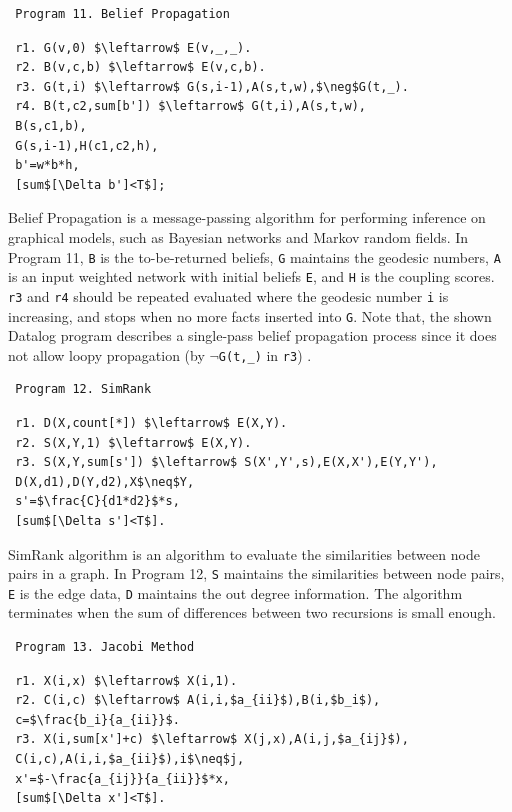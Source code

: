 \begin{appendix}
 
 \begin{verbatim}
 Program 11. Belief Propagation
 \end{verbatim}\small
 \begin{lstlisting}
 r1. G(v,0) $\leftarrow$ E(v,_,_).
 r2. B(v,c,b) $\leftarrow$ E(v,c,b).
 r3. G(t,i) $\leftarrow$ G(s,i-1),A(s,t,w),$\neg$G(t,_).
 r4. B(t,c2,sum[b']) $\leftarrow$ G(t,i),A(s,t,w),
 B(s,c1,b),
 G(s,i-1),H(c1,c2,h),
 b'=w*b*h,
 [sum$[\Delta b']<T$];
 \end{lstlisting}
 \normalsize
 
 Belief Propagation \cite{910572} is a message-passing algorithm for performing inference on graphical models, such as Bayesian networks and Markov random fields. In Program 11, \texttt{B} is the to-be-returned beliefs, \texttt{G} maintains the geodesic numbers, \texttt{A} is an input weighted network with initial beliefs \texttt{E}, and \texttt{H} is the coupling scores. \texttt{r3} and \texttt{r4} should be repeated evaluated where the geodesic number \texttt{i} is increasing, and stops when no more facts inserted into \texttt{G}. Note that, the shown Datalog program describes a single-pass belief propagation process since it does not allow loopy propagation (by $\neg$\texttt{G(t,\_)} in \texttt{r3}) \cite{Gatterbauer:2015:LSB:2735479.2735490}.
 
 \begin{verbatim}
 Program 12. SimRank
 \end{verbatim}\small
 \begin{lstlisting}
 r1. D(X,count[*]) $\leftarrow$ E(X,Y).
 r2. S(X,Y,1) $\leftarrow$ E(X,Y).
 r3. S(X,Y,sum[s']) $\leftarrow$ S(X',Y',s),E(X,X'),E(Y,Y'),
 D(X,d1),D(Y,d2),X$\neq$Y,
 s'=$\frac{C}{d1*d2}$*s,
 [sum$[\Delta s']<T$].
 \end{lstlisting}
 \normalsize
 
 SimRank algorithm \cite{Jeh:2002:SMS:775047.775126} is an algorithm to evaluate the similarities between node pairs in a graph. In Program 12, \texttt{S} maintains the similarities between node pairs, \texttt{E} is the edge data, \texttt{D} maintains the out degree information. The algorithm terminates when the sum of differences between two recursions is small enough.
 
 \begin{verbatim}
 Program 13. Jacobi Method
 \end{verbatim}\small
 \begin{lstlisting}
 r1. X(i,x) $\leftarrow$ X(i,1).
 r2. C(i,c) $\leftarrow$ A(i,i,$a_{ii}$),B(i,$b_i$),
 c=$\frac{b_i}{a_{ii}}$.
 r3. X(i,sum[x']+c) $\leftarrow$ X(j,x),A(i,j,$a_{ij}$),
 C(i,c),A(i,i,$a_{ii}$),i$\neq$j,
 x'=$-\frac{a_{ij}}{a_{ii}}$*x,
 [sum$[\Delta x']<T$].
 \end{lstlisting}
 \normalsize
 

\end{appendix}

